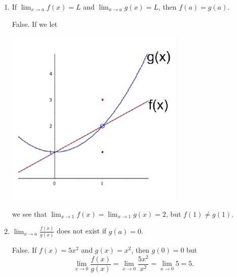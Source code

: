 \documentclass[nooutcomes,handout]{ximera}
\begin{document}
\begin{problem}
\begin{enumerate}
			\item  If $ \lim_{x \to a} f(x) = L $ and $  \lim_{x \to a} g(x) = L $, then $f(a) = g(a)$.
			\begin{freeResponse}
			 False.  If we let 
			 
			 	\begin{image}
			       \includegraphics{Figure3}
			 	\end{image}
				
			 we see that $ \lim_{x \to 1} f(x) = \lim_{x \to 1} g(x) = 2$, but $f(1) \ne g(1)$.
			\end{freeResponse}
			
			\item  $ \lim_{x \to a} \frac{f(x)}{g(x)} $ does not exist if $g(a) = 0$.
			\begin{freeResponse}
			False.  If $f(x) = 5x^2$ and $g(x) = x^2$, then $g(0) = 0$ but 
			$$ \lim_{x \to 0} \frac{f(x)}{g(x)} = \lim_{x \to 0} \frac{5x^2}{x^2} = \lim_{x \to 0} 5 = 5.$$
			\end{freeResponse}
			
			
			
			\end{enumerate}
\end{problem}
	
\end{document}
